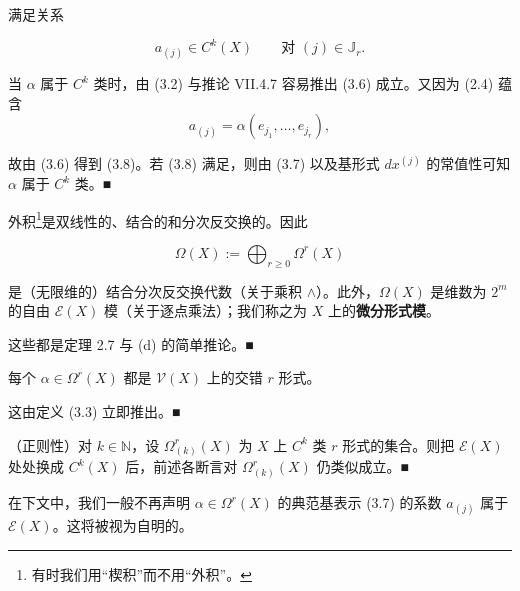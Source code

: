 \begin{remark}
\begin{items}
满足关系

\begin{equation}
a_{(j)} \in C^{k}(X) \qquad \text{对 } (j) \in \mathbb{J}_{r}.\tag{3.8}
\end{equation}

\proofhead
当 $ \alpha $ 属于 $ C^{k} $ 类时，由 (3.2) 与推论 VII.4.7 容易推出 (3.6) 成立。又因为 (2.4) 蕴含
\begin{equation}
a_{(j)} = \alpha(e_{j_{1}},\ldots,e_{j_{r}}),\tag{3.9}
\end{equation}

故由 (3.6) 得到 (3.8)。若 (3.8) 满足，则由 (3.7) 以及基形式 $ dx^{(j)} $ 的常值性可知 $ \alpha $ 属于 $ C^{k} $ 类。\nobreak\hspace{0.35em}■

\item

外积\footnote{有时我们用“楔积”而不用“外积”。}是双线性的、结合的和分次反交换的。因此

\[
\Omega(X) := \bigoplus_{r \ge 0} \Omega^{r}(X)
\]

是（无限维的）结合分次反交换代数（关于乘积 $ \wedge $）。此外，$ \Omega(X) $ 是维数为 $ 2^{m} $ 的自由 $ \mathcal{E}(X) $ 模（关于逐点乘法）；我们称之为 $ X $ 上的\textbf{微分形式模}。

\proofhead
这些都是定理 2.7 与 (d) 的简单推论。\nobreak\hspace{0.35em}■
\item

每个 $ \alpha \in \Omega^{r}(X) $ 都是 $ \mathcal{V}(X) $ 上的交错 $ r $ 形式。

\proofhead
这由定义 (3.3) 立即推出。\nobreak\hspace{0.35em}■
\item

（正则性）对 $ k \in \mathbb{N} $，设 $ \Omega^{r}_{(k)}(X) $ 为 $ X $ 上 $ C^{k} $ 类 $ r $ 形式的集合。则把 $ \mathcal{E}(X) $ 处处换成 $ C^{k}(X) $ 后，前述各断言对 $ \Omega^{r}_{(k)}(X) $ 仍类似成立。\nobreak\hspace{0.35em}■

\end{items}

在下文中，我们一般不再声明 $ \alpha \in \Omega^{r}(X) $ 的典范基表示 (3.7) 的系数 $ a_{(j)} $ 属于 $ \mathcal{E}(X) $。这将被视为自明的。

\end{remark}

